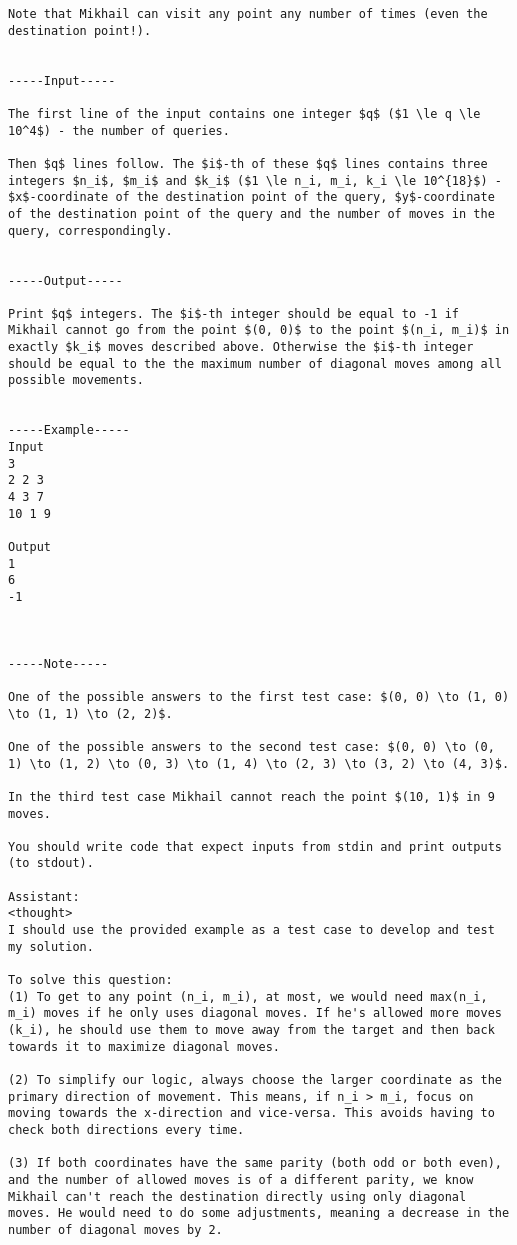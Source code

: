 \begin{lstlisting}[breaklines]
Note that Mikhail can visit any point any number of times (even the destination point!).


-----Input-----

The first line of the input contains one integer $q$ ($1 \le q \le 10^4$) - the number of queries.

Then $q$ lines follow. The $i$-th of these $q$ lines contains three integers $n_i$, $m_i$ and $k_i$ ($1 \le n_i, m_i, k_i \le 10^{18}$) - $x$-coordinate of the destination point of the query, $y$-coordinate of the destination point of the query and the number of moves in the query, correspondingly.


-----Output-----

Print $q$ integers. The $i$-th integer should be equal to -1 if Mikhail cannot go from the point $(0, 0)$ to the point $(n_i, m_i)$ in exactly $k_i$ moves described above. Otherwise the $i$-th integer should be equal to the the maximum number of diagonal moves among all possible movements.


-----Example-----
Input
3
2 2 3
4 3 7
10 1 9

Output
1
6
-1



-----Note-----

One of the possible answers to the first test case: $(0, 0) \to (1, 0) \to (1, 1) \to (2, 2)$.

One of the possible answers to the second test case: $(0, 0) \to (0, 1) \to (1, 2) \to (0, 3) \to (1, 4) \to (2, 3) \to (3, 2) \to (4, 3)$.

In the third test case Mikhail cannot reach the point $(10, 1)$ in 9 moves.

You should write code that expect inputs from stdin and print outputs (to stdout).

Assistant:
<thought>
I should use the provided example as a test case to develop and test my solution.

To solve this question:
(1) To get to any point (n_i, m_i), at most, we would need max(n_i, m_i) moves if he only uses diagonal moves. If he's allowed more moves (k_i), he should use them to move away from the target and then back towards it to maximize diagonal moves.

(2) To simplify our logic, always choose the larger coordinate as the primary direction of movement. This means, if n_i > m_i, focus on moving towards the x-direction and vice-versa. This avoids having to check both directions every time.

(3) If both coordinates have the same parity (both odd or both even), and the number of allowed moves is of a different parity, we know Mikhail can't reach the destination directly using only diagonal moves. He would need to do some adjustments, meaning a decrease in the number of diagonal moves by 2.


\end{lstlisting}

